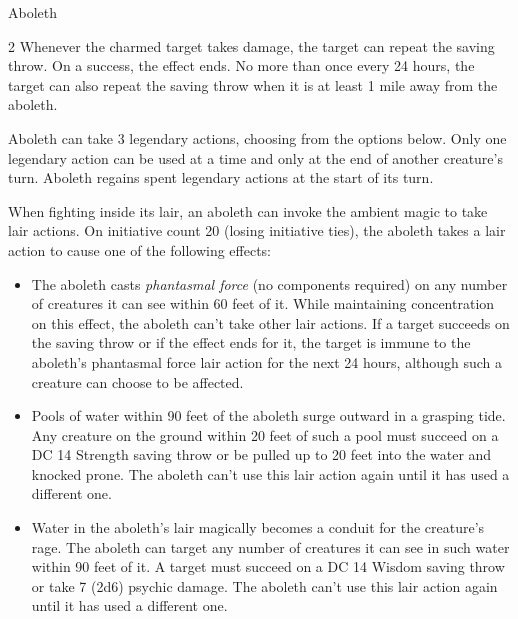 \documentclass[10pt,a4paper,twoside,bg=print,twocolumn,openany,nodeprecatedcode]{dndbook}
\begin{document}
\begin{DndMonster}[float*=b,width=\textwidth + 8pt]{Aboleth}
\begin{multicols}{2}
Whenever the charmed target takes damage, the target can repeat the saving throw. On a success, the effect ends. No more than once every 24 hours, the target can also repeat the saving throw when it is at least 1 mile away from the aboleth.

Aboleth can take 3 legendary actions, choosing from the options below. Only one legendary action can be used at a time and only at the end of another creature's turn. Aboleth regains spent legendary actions at the start of its turn.

\begin{DndMonsterLegendaryActions}
\end{DndMonsterLegendaryActions}
When fighting inside its lair, an aboleth can invoke the ambient magic to take lair actions. On initiative count 20 (losing initiative ties), the aboleth takes a lair action to cause one of the following effects:


\begin{itemize}
\item The aboleth casts \textit{phantasmal force} (no components required) on any number of creatures it can see within 60 feet of it. While maintaining concentration on this effect, the aboleth can't take other lair actions. If a target succeeds on the saving throw or if the effect ends for it, the target is immune to the aboleth's phantasmal force lair action for the next 24 hours, although such a creature can choose to be affected.
\item Pools of water within 90 feet of the aboleth surge outward in a grasping tide. Any creature on the ground within 20 feet of such a pool must succeed on a DC 14 Strength saving throw or be pulled up to 20 feet into the water and knocked prone. The aboleth can't use this lair action again until it has used a different one.
\item Water in the aboleth's lair magically becomes a conduit for the creature's rage. The aboleth can target any number of creatures it can see in such water within 90 feet of it. A target must succeed on a DC 14 Wisdom saving throw or take 7 (2d6) psychic damage. The aboleth can't use this lair action again until it has used a different one.
\end{itemize}


\end{multicols}
\end{DndMonster}
\end{document}
